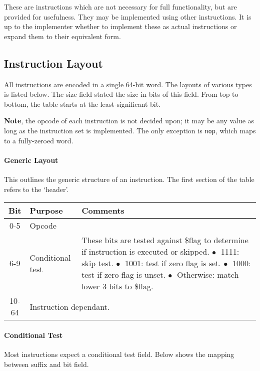 \documentclass[10pt]{article}
\begin{document}
These are instructions which are not necessary for full functionality, but are provided for usefulness.
They may be implemented using other instructions.
It is up to the implementer whether to implement these as actual instructions or expand them to their equivalent form.

\subsection{Instruction Layout}

All instructions are encoded in a single 64-bit word.
The layouts of various types is listed below.
The size field stated the size in bits of this field.
From top-to-bottom, the table starts at the least-significant bit.

\textbf{Note}, the opcode of each instruction is not decided upon; it may be any value as long as the instruction set is implemented.
The only exception is \texttt{nop}, which maps to a fully-zeroed word.

\paragraph{Generic Layout}
This outlines the generic structure of an instruction.
The first section of the table refers to the `header'.

\bigskip
\begin{tabular}{|c|l|l|}
    \hline
    \textbf{Bit} & \textbf{Purpose} & \textbf{Comments} \\
    \hline
    0-5 & Opcode & \\
    \hline
    6-9 & Conditional test & \makecell[l]{These bits are tested against \$flag to determine if instruction is executed or skipped.\\%
    \(\bullet\;\) 1111: skip test.\\%
    \(\bullet\;\) 1001: test if zero flag is set.\\%
    \(\bullet\;\) 1000: test if zero flag is unset.\\%
    \(\bullet\;\) Otherwise: match lower 3 bits to \$flag.} \\
    \hline
    \hline
    10-64 & \multicolumn{2}{l|}{Instruction dependant.} \\
    \hline
\end{tabular}

\paragraph{Conditional Test}
Most instructions expect a conditional test field.
Below shows the mapping between suffix and bit field.
\end{document}
